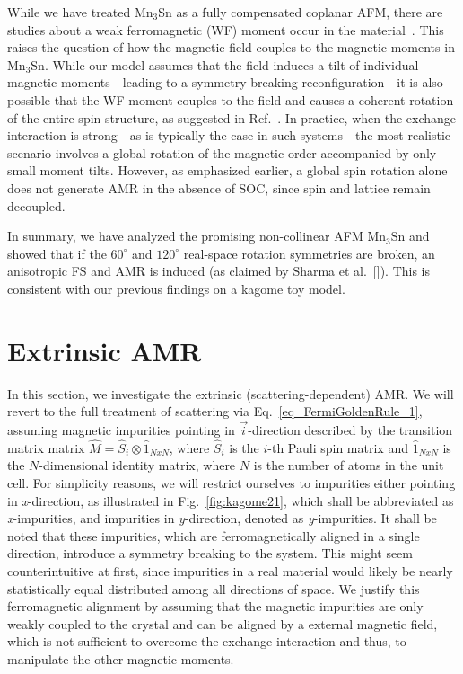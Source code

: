 \documentclass[prb,showpacs,amsmath,amssymb,superscriptaddress,twocolumn,floatfix]{revtex4-1}
\begin{document}
While we have treated Mn$_3$Sn as a fully compensated coplanar AFM, there are studies about a weak ferromagnetic (WF) moment occur in the material~\cite{Tomiyashi:1982}. {\color{blue} This raises the question of how the magnetic field couples to the magnetic moments in Mn$_3$Sn. While our model assumes that the field induces a tilt of individual magnetic moments—leading to a symmetry-breaking reconfiguration—it is also possible that the WF moment couples to the field and causes a coherent rotation of the entire spin structure, as suggested in Ref.~\cite{Wu:2023}. In practice, when the exchange interaction is strong—as is typically the case in such systems—the most realistic scenario involves a global rotation of the magnetic order accompanied by only small moment tilts. However, as emphasized earlier, a global spin rotation alone does not generate AMR in the absence of SOC, since spin and lattice remain decoupled. }

In summary, we have analyzed the promising non-collinear AFM Mn$_3$Sn and showed that if the $60^\circ$ and $120^\circ$ real-space rotation symmetries are broken, an anisotropic FS and AMR is induced (as claimed by Sharma et al.~[]). This is consistent with our previous findings on a kagome toy model.




\section{Extrinsic AMR}
\label{sec_extrinsic}

In this section, we investigate the extrinsic (scattering-dependent) AMR. We will revert to the full treatment of scattering via Eq.~\ref{eq_FermiGoldenRule_1}, assuming magnetic impurities pointing in $\vec{i}$-direction described by the transition matrix matrix $\hat{M} = \hat{S}_i \otimes \hat{1}_{NxN}$, where $\hat{S}_i$ is the $i$-th Pauli spin matrix and $\hat{1}_{NxN}$ is the $N$-dimensional identity matrix, where $N$ is the number of atoms in the unit cell. For simplicity reasons, we will restrict ourselves to impurities either pointing in \textit{x}-direction, as illustrated in Fig.~\ref{fig:kagome21}, which shall be abbreviated as \textit{x}-impurities, and impurities in \textit{y}-direction, denoted as \textit{y}-impurities. It shall be noted that these impurities, which are ferromagnetically aligned in a single direction, introduce a symmetry breaking to the system. This might seem counterintuitive at first, since impurities in a real material would likely be nearly statistically equal distributed among all directions of space. We justify this ferromagnetic alignment by assuming that the magnetic impurities are only weakly coupled to the crystal and can be aligned by a external magnetic field, which is not sufficient to overcome the exchange interaction and thus, to manipulate the other magnetic moments.
\end{document}
